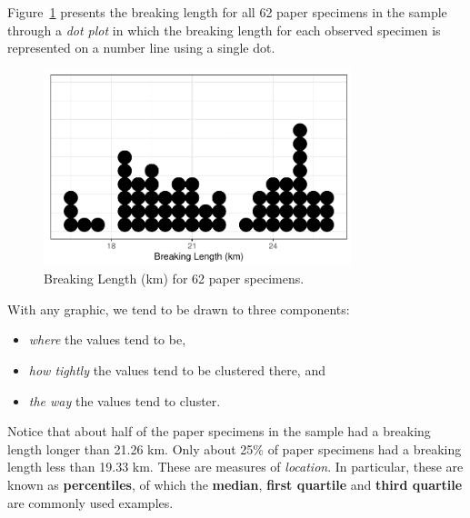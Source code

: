 \documentclass[
  letterpaper,
  DIV=11,
  numbers=noendperiod]{scrreprt}
\providecommand{\tightlist}{%
  \setlength{\itemsep}{0pt}\setlength{\parskip}{0pt}}\usepackage{longtable,booktabs,array}
\theoremstyle{definition}
\theoremstyle{plain}
\theoremstyle{definition}
\theoremstyle{remark}
\begin{document}
Figure~\ref{fig-summaries-paper-dotplot} presents the breaking length
for all 62 paper specimens in the sample through a \emph{dot plot} in
which the breaking length for each observed specimen is represented on a
number line using a single dot.

\begin{figure}

{\centering \includegraphics[width=0.8\textwidth,height=\textheight]{./images/fig-summaries-paper-dotplot-1.pdf}

}

\caption{\label{fig-summaries-paper-dotplot}Breaking Length (km) for 62
paper specimens.}

\end{figure}

With any graphic, we tend to be drawn to three components:

\begin{itemize}
\tightlist
\item
  \emph{where} the values tend to be,
\item
  \emph{how tightly} the values tend to be clustered there, and
\item
  \emph{the way} the values tend to cluster.
\end{itemize}

Notice that about half of the paper specimens in the sample had a
breaking length longer than 21.26 km. Only about 25\% of paper specimens
had a breaking length less than 19.33 km. These are measures of
\emph{location}. In particular, these are known as \textbf{percentiles},
of which the \textbf{median}, \textbf{first quartile} and \textbf{third
quartile} are commonly used examples.
\end{document}
